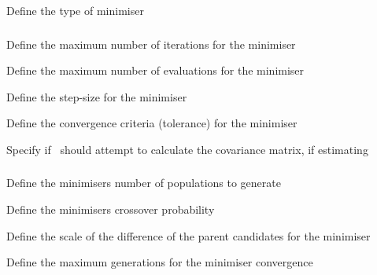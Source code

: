 
 {Define the type of minimiser}

\subsubsection[Numerical differences minimiser]{} 

 {Define the maximum number of iterations for the minimiser}

 {Define the maximum number of evaluations for the minimiser}

 {Define the step-size for the minimiser}

 {Define the convergence criteria (tolerance) for the minimiser}

 {Specify if \SPM\ should attempt to calculate the covariance matrix, if estimating}

\subsubsection[Differential evolution minimiser]{} 

 {Define the minimisers number of populations to generate}

 {Define the minimisers crossover probability }

 {Define the scale of the difference of the parent candidates for the minimiser}

 {Define the maximum generations for the minimiser convergence}

